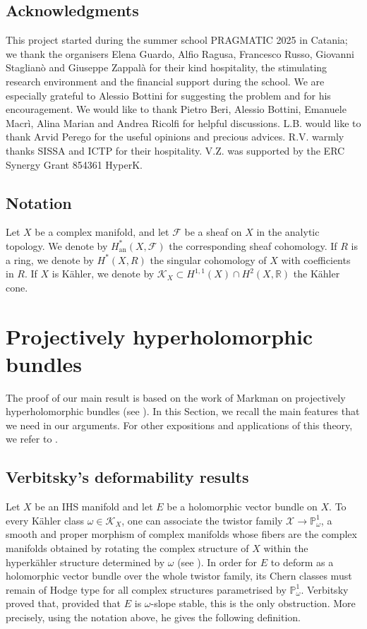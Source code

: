 \documentclass[12pt,a4paper]{amsart}
\theoremstyle{plain}
\theoremstyle{definition}
\theoremstyle{remark}
\def\H{H}
\newcommand{\RR}{\mathbb{R}}
\begin{document}
\subsection*{Acknowledgments}
This project started during the summer school PRAGMATIC 2025 in
Catania; we thank the organisers Elena Guardo, Alfio Ragusa, Francesco Russo, Giovanni
Staglianò and Giuseppe Zappalà for their kind hospitality, the stimulating research environment
and the financial support during the school. We are especially grateful to Alessio Bottini for suggesting the problem and for his encouragement. We would like to thank Pietro Beri, Alessio Bottini, Emanuele Macrì, Alina Marian and Andrea Ricolfi for helpful discussions. L.B. would like to thank Arvid Perego for the useful opinions and precious advices. 
R.V. warmly thanks SISSA and ICTP for their hospitality.
V.Z. was supported by the ERC Synergy Grant 854361 HyperK.
\subsection*{Notation}
Let $X$ be a complex manifold, and let $\mathcal{F}$ be a sheaf on $X$ in the analytic topology. We denote by $\H^*_{\mathrm{an}}(X,\mathcal{F})$ the corresponding sheaf cohomology. If $R$ is a ring, we denote by $\H^*(X,R)$ the singular cohomology of $X$ with coefficients in $R$. If $X$ is K\"ahler, we denote by $\mathcal{K}_X\subset \H^{1,1}(X)\cap \H^2(X,\RR)$ the K\"ahler cone.


\section{Projectively hyperholomorphic bundles}\label{secprojhyperholo}
The proof of our main result is based on the work of Markman on projectively hyperholomorphic bundles (see \cite{markman}). In this Section, we recall the main features that we need in our arguments. For other expositions and applications of this theory, we refer to \cite{dequivconj, ogrady-moduli-sheaves-hk, kapustka-kapustka-derived-equivalent-hk4}.

\subsection{Verbitsky's deformability results}
Let $X$ be an IHS manifold and let $E$ be a holomorphic vector bundle on $X$. To every K\"ahler class $\omega \in \mathcal{K}_X$, one can associate the twistor family $\mathcal{X} \rightarrow \mathbb{P}^1_\omega$, a smooth and proper morphism of complex manifolds whose fibers are the complex manifolds obtained by rotating the complex structure of $X$ within the hyperk\"ahler structure determined by $\omega$ (see \cite[Section~1.13]{Huy-HK-basic}). In order for $E$ to deform as a holomorphic vector bundle over the whole twistor family, its Chern classes must remain of Hodge type for all complex structures parametrised by $\mathbb{P}^1_\omega$. Verbitsky proved that, provided that $E$ is $\omega$-slope stable, this is the only obstruction. More precisely, using the notation above, he gives the following definition.
\end{document}
